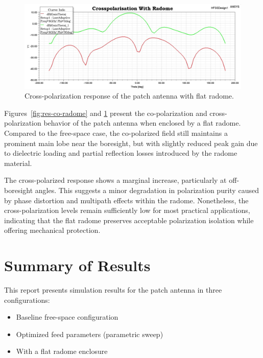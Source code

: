 \begin{figure}[H]
    \centering
    \includegraphics[width=1.0\textwidth]{figures/with_radome/Cross.jpeg}
    \caption{Cross-polarization response of the patch antenna with flat radome.}
    \label{fig:res-cross-radome}
\end{figure}

Figures~\ref{fig:res-co-radome} and \ref{fig:res-cross-radome} present the co-polarization and cross-polarization behavior of the patch antenna when enclosed by a flat radome. Compared to the free-space case, the co-polarized field still maintains a prominent main lobe near the boresight, but with slightly reduced peak gain due to dielectric loading and partial reflection losses introduced by the radome material.

The cross-polarized response shows a marginal increase, particularly at off-boresight angles. This suggests a minor degradation in polarization purity caused by phase distortion and multipath effects within the radome. Nonetheless, the cross-polarization levels remain sufficiently low for most practical applications, indicating that the flat radome preserves acceptable polarization isolation while offering mechanical protection.


\newpage
\section*{Summary of Results}

This report presents simulation results for the patch antenna in three configurations:
\begin{itemize}
\item Baseline free-space configuration
\item Optimized feed parameters (parametric sweep)
\item With a flat radome enclosure
\end{itemize}

